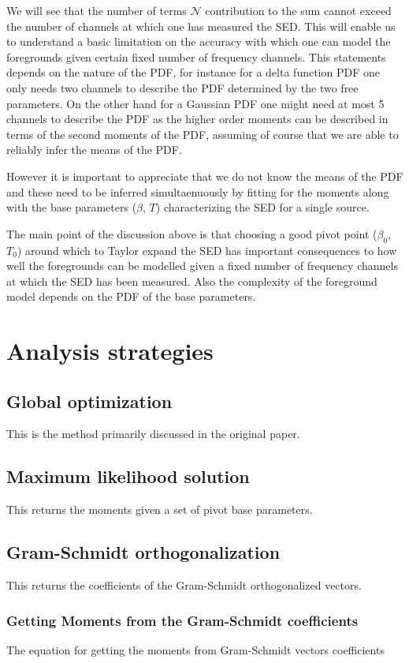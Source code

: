 We will see that the number of terms $\mathcal{N}$ contribution to the sum cannot exceed the number of channels at which one has measured the SED. This will enable us to understand a basic limitation on the accuracy with which one can model the foregrounds given certain fixed number of frequency channels. This statements depends on the nature of the PDF, for instance for a delta function PDF one only needs two channels to describe the PDF determined by the two free parameters. On the other hand for a Gaussian PDF one might need at most 5 channels to describe the PDF as the higher order moments can be described in terms of the second moments of the PDF, assuming of course that we are able to reliably infer the means of the PDF. 

However it is important to appreciate that we do not know the means of the PDF and these need to be inferred simultaenuously by fitting for the moments along with the base parameters ($\beta$, $T$) characterizing the SED for a single source. 

The main point of the discussion above is that choosing a good pivot point ($\beta_0$, $T_0$) around which to Taylor expand the SED has important consequences to how well the foregrounds can be modelled given a fixed number of frequency channels at which the SED has been measured. Also the complexity of the foreground model depends on the PDF of the base parameters.  

\section{Analysis strategies}

\subsection{Global optimization}
This is the method primarily discussed in the original paper.
\subsection{Maximum likelihood solution}
This returns the moments given a set of pivot base parameters.
\subsection{Gram-Schmidt orthogonalization}
This returns the coefficients of the Gram-Schmidt orthogonalized vectors.
\subsubsection{Getting Moments from the Gram-Schmidt coefficients}
The equation for getting the moments from Gram-Schmidt vectors coefficients
